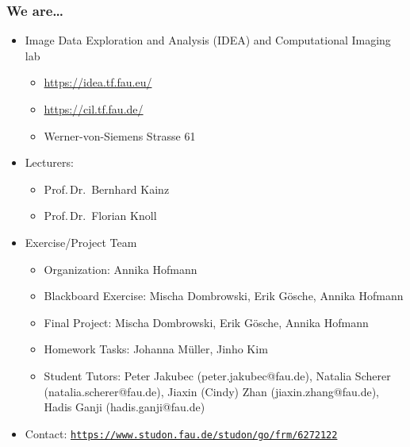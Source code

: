 

\subtitle{Motivation}




\nocite{*}

\frame[plain,c]{\titlepage} %

\begin{frame}
	\frametitle{We are\ldots}
	\begin{itemize}
		\setlength\itemsep{0.3cm}
		\item Image Data Exploration and Analysis (IDEA) and Computational Imaging lab
		\begin{itemize}
			\item \url{https://idea.tf.fau.eu/}
			\item \url{https://cil.tf.fau.de/}
			\item Werner-von-Siemens Strasse 61
		\end{itemize}
		\item Lecturers:
		\begin{itemize}
			\item Prof.\,Dr.\ Bernhard Kainz
			\item Prof.\,Dr.\ Florian Knoll
		\end{itemize}
		\item Exercise/Project Team
		\begin{itemize}
			\item Organization: \tabto{3cm} Annika Hofmann  
			\item Blackboard Exercise: \tabto{3cm} Mischa Dombrowski, Erik Gösche, Annika Hofmann  
			\item Final Project: \tabto{3cm} Mischa Dombrowski, Erik Gösche, Annika Hofmann  
			\item Homework Tasks: \tabto{3cm} Johanna M\"uller, Jinho Kim
			\item Student Tutors: \tabto{3cm} Peter Jakubec (peter.jakubec@fau.de), Natalia Scherer (natalia.scherer@fau.de), Jiaxin (Cindy) Zhan (jiaxin.zhang@fau.de), Hadis Ganji (hadis.ganji@fau.de)
		\end{itemize}
		\item Contact: \texttt{\url{https://www.studon.fau.de/studon/go/frm/6272122}}
	\end{itemize}
\end{frame}

